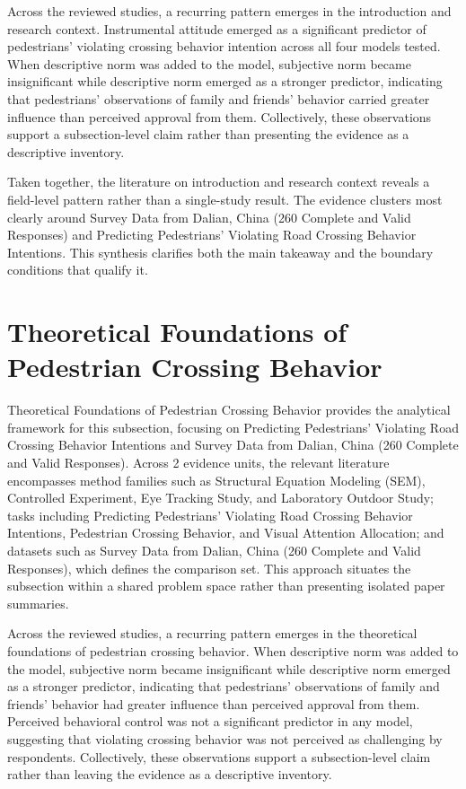 \documentclass{article}
\begin{document}
Across the reviewed studies, a recurring pattern emerges in the introduction and research context. Instrumental attitude emerged as a significant predictor of pedestrians' violating crossing behavior intention across all four models tested. When descriptive norm was added to the model, subjective norm became insignificant while descriptive norm emerged as a stronger predictor, indicating that pedestrians' observations of family and friends' behavior carried greater influence than perceived approval from them. Collectively, these observations support a subsection-level claim rather than presenting the evidence as a descriptive inventory. \cite{08_2016_zhou_aap,09_2018_jiang_aap}

Taken together, the literature on introduction and research context reveals a field-level pattern rather than a single-study result. The evidence clusters most clearly around Survey Data from Dalian, China (260 Complete and Valid Responses) and Predicting Pedestrians' Violating Road Crossing Behavior Intentions. This synthesis clarifies both the main takeaway and the boundary conditions that qualify it. \cite{08_2016_zhou_aap,09_2018_jiang_aap}

\section{Theoretical Foundations of Pedestrian Crossing Behavior}
Theoretical Foundations of Pedestrian Crossing Behavior provides the analytical framework for this subsection, focusing on Predicting Pedestrians' Violating Road Crossing Behavior Intentions and Survey Data from Dalian, China (260 Complete and Valid Responses). Across 2 evidence units, the relevant literature encompasses method families such as Structural Equation Modeling (SEM), Controlled Experiment, Eye Tracking Study, and Laboratory Outdoor Study; tasks including Predicting Pedestrians' Violating Road Crossing Behavior Intentions, Pedestrian Crossing Behavior, and Visual Attention Allocation; and datasets such as Survey Data from Dalian, China (260 Complete and Valid Responses), which defines the comparison set. This approach situates the subsection within a shared problem space rather than presenting isolated paper summaries. \cite{08_2016_zhou_aap,09_2018_jiang_aap}

Across the reviewed studies, a recurring pattern emerges in the theoretical foundations of pedestrian crossing behavior. When descriptive norm was added to the model, subjective norm became insignificant while descriptive norm emerged as a stronger predictor, indicating that pedestrians' observations of family and friends' behavior had greater influence than perceived approval from them. Perceived behavioral control was not a significant predictor in any model, suggesting that violating crossing behavior was not perceived as challenging by respondents. Collectively, these observations support a subsection-level claim rather than leaving the evidence as a descriptive inventory. \cite{08_2016_zhou_aap,09_2018_jiang_aap}
\end{document}
